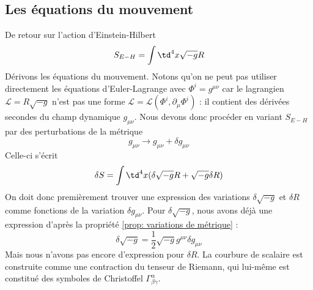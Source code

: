 \subsection{Les équations du mouvement}
De retour sur l'action d'Einstein-Hilbert
\begin{equation}
    S_{E-H} = \int \td ^4x \sqrt{-g}R
    \label{eq:action d'Einstein-Hilbert 2}
\end{equation}
Dérivons les équations du mouvement. Notons qu'on ne peut pas utiliser directement les équations d'Euler-Lagrange avec $\Phi^{i} = g^{\mu \nu}$ car le lagrangien $\mathcal{L} = R\sqrt{-g}$ n'est pas une forme $\mathcal{L} = \mathcal{L}(\Phi^{i}, \partial_{\mu} \Phi^{i})$ : il contient des dérivées secondes du champ dynamique $g_{\mu \nu}$. Nous devons donc procéder en variant $S_{E-H}$ par des perturbations de la métrique
\begin{equation}
    g_{\mu \nu} \rightarrow g_{\mu \nu} + \delta g_{\mu \nu}
\end{equation}
Celle-ci s'écrit
\begin{equation}
    \delta S = \int \td ^4x (\delta \sqrt{-g}R + \sqrt{-g}\delta R)
\end{equation}
On doit donc premièrement trouver une expression des variations $\delta \sqrt{-g}$ et $\delta R$ comme fonctions de la variation $ \delta g_{\mu\nu}$. Pour $\delta \sqrt{-g}$, nous avons déjà une expression d'après la propriété \ref{prop: variations de métrique} :
\begin{equation}
    \delta \sqrt{-g} = \frac{1}{2} \sqrt{-g} g^{\mu\nu} \delta g_{\mu\nu}
\end{equation}
Mais nous n'avons pas encore d'expression pour $\delta R$. La courbure de scalaire est construite comme une contraction du tenseur de Riemann, qui lui-même est constitué des symboles de Christoffel $\Gamma^\alpha_{\beta\gamma}$.

